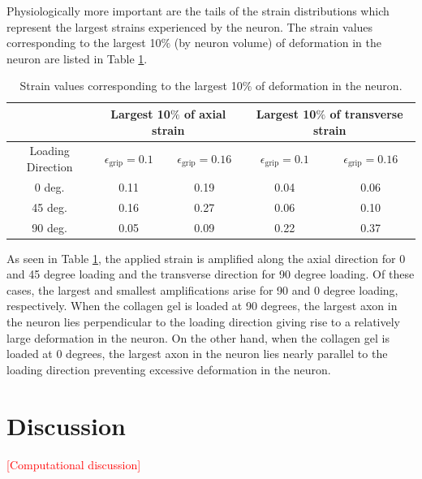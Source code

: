\documentclass[]{interact}
\newcommand{\red}[1]{\textcolor{red}{[#1]}}
\begin{document}
Physiologically more important are the tails of the strain distributions which represent the largest strains experienced by the neuron. The strain values corresponding to the largest 10$\%$ (by neuron volume) of deformation in the neuron are listed in Table \ref{table:ccdf_tail_strains}. 
%
\begin{table}[ht]
\begin{center}
\begin{tabular}{ c c c c c }
\hline\hline
& \multicolumn{2}{c}{Largest 10$\%$ of axial strain} & \multicolumn{2}{c}{Largest 10$\%$ of transverse strain} \\ \hline 
Loading Direction & $\epsilon_{\text{grip}}=0.1$ & $\epsilon_{\text{grip}}=0.16$ & $\epsilon_{\text{grip}}=0.1$ & $\epsilon_{\text{grip}}=0.16$ \\
\hline 
0 deg. & 0.11 & 0.19 & 0.04 & 0.06\\ 
45 deg. & 0.16 & 0.27 & 0.06 & 0.10\\
90 deg. & 0.05 & 0.09 & 0.22 & 0.37\\ \hline \hline
\end{tabular}
\end{center}
\caption{Strain values corresponding to the largest 10$\%$ of deformation in the neuron.}
\label{table:ccdf_tail_strains}
\end{table}
%
As seen in Table \ref{table:ccdf_tail_strains}, the applied strain is amplified along the axial direction for 0 and 45 degree loading and the transverse direction for 90 degree loading. Of these cases, the largest and smallest amplifications arise for 90 and 0 degree loading, respectively. When the collagen gel is loaded at 90 degrees, the largest axon in the neuron lies perpendicular to the loading direction giving rise to a relatively large deformation in the neuron. On the other hand, when the collagen gel is loaded at 0 degrees, the largest axon in the neuron lies nearly parallel to the loading direction preventing excessive deformation in the neuron.

\section{Discussion}
\label{sec:discussion}
\red{Computational discussion}
\end{document}
